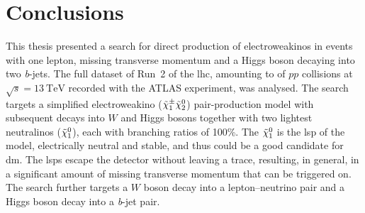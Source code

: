 

\chapter{Conclusions}

\ifpdf
    \graphicspath{{chapter-summary/Figs/Raster/}{chapter-summary/Figs/PDF/}{chapter-summary/Figs/}}
\else
    \graphicspath{{chapter-summary/Figs/Vector/}{chapter-summary/Figs/}}
\fi


This thesis presented a search for direct production of electroweakinos in events with one lepton, missing transverse momentum and a Higgs boson decaying into two \textit{b}-jets.
The full dataset of Run~2 of the \gls{lhc}, amounting to \onethirtynineifb of $pp$ collisions at $\sqrt{s} = \SI{13}{\TeV}$ recorded with the ATLAS experiment, was analysed.
The search targets a simplified electroweakino ($\tilde{\chi}_1^\pm\tilde{\chi}_2^0$) pair-production model with subsequent decays into $W$ and Higgs bosons together with two lightest neutralinos ($\tilde{\chi}_1^0$), each with branching ratios of 100\%. The $\tilde{\chi}_1^0$ is the \gls{lsp} of the model, electrically neutral and stable, and thus could be a good candidate for \gls{dm}.
The \glspl{lsp} escape the detector without leaving a trace, resulting, in general, in a significant amount of missing transverse momentum that can be triggered on.
The search further targets a $W$ boson decay into a lepton--neutrino pair and a Higgs boson decay into a \textit{b}-jet pair.

